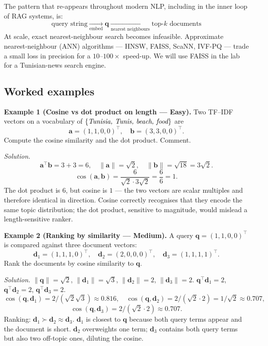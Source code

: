 The pattern that re-appears throughout modern NLP, including in the inner loop of RAG systems, is:
\[ \boxed{ \text{query string} \xrightarrow[\text{embed}]{} \mathbf{q} \xrightarrow[\text{nearest neighbours}]{} \text{top-}k \text{ documents} } \]
At scale, exact nearest-neighbour search becomes infeasible. Approximate nearest-neighbour (ANN) algorithms --- HNSW, FAISS, ScaNN, IVF-PQ --- trade a small loss in precision for a $10$--$100\times$ speed-up. We will use FAISS in the lab for a Tunisian-news search engine.

\subsection{Worked examples}

\textbf{Example 1 (Cosine vs dot product on length --- Easy).}
Two TF--IDF vectors on a vocabulary of $\{\emph{Tunisia, Tunis, beach, food}\}$ are
\[ \mathbf{a} = (1, 1, 0, 0)^\top, \quad \mathbf{b} = (3, 3, 0, 0)^\top. \]
Compute the cosine similarity and the dot product. Comment.

\textit{Solution.}
\[ \mathbf{a}^\top \mathbf{b} = 3 + 3 = 6, \quad \|\mathbf{a}\| = \sqrt{2}, \quad \|\mathbf{b}\| = \sqrt{18} = 3\sqrt{2}. \]
\[ \cos(\mathbf{a}, \mathbf{b}) = \frac{6}{\sqrt{2} \cdot 3\sqrt{2}} = \frac{6}{6} = 1. \]
The dot product is $6$, but cosine is $1$ --- the two vectors are scalar multiples and therefore identical in direction. Cosine correctly recognises that they encode the same topic distribution; the dot product, sensitive to magnitude, would mislead a length-sensitive ranker.

\medskip

\textbf{Example 2 (Ranking by similarity --- Medium).}
A query $\mathbf{q} = (1, 1, 0, 0)^\top$ is compared against three document vectors:
\[ \mathbf{d}_1 = (1, 1, 1, 0)^\top, \quad \mathbf{d}_2 = (2, 0, 0, 0)^\top, \quad \mathbf{d}_3 = (1, 1, 1, 1)^\top. \]
Rank the documents by cosine similarity to $\mathbf{q}$.

\textit{Solution.}
$\|\mathbf{q}\| = \sqrt{2}$, $\|\mathbf{d}_1\| = \sqrt{3}$, $\|\mathbf{d}_2\| = 2$, $\|\mathbf{d}_3\| = 2$.
$\mathbf{q}^\top \mathbf{d}_1 = 2$, $\mathbf{q}^\top \mathbf{d}_2 = 2$, $\mathbf{q}^\top \mathbf{d}_3 = 2$.
\[ \cos(\mathbf{q}, \mathbf{d}_1) = 2/(\sqrt{2}\sqrt{3}) \approx 0.816, \quad \cos(\mathbf{q}, \mathbf{d}_2) = 2/(\sqrt{2}\cdot 2) = 1/\sqrt{2} \approx 0.707, \]
\[ \cos(\mathbf{q}, \mathbf{d}_3) = 2/(\sqrt{2} \cdot 2) \approx 0.707. \]
Ranking: $\mathbf{d}_1 \succ \mathbf{d}_2 \approx \mathbf{d}_3$.
$\mathbf{d}_1$ is closest to $\mathbf{q}$ because both query terms appear and the document is short. $\mathbf{d}_2$ overweights one term; $\mathbf{d}_3$ contains both query terms but also two off-topic ones, diluting the cosine.

